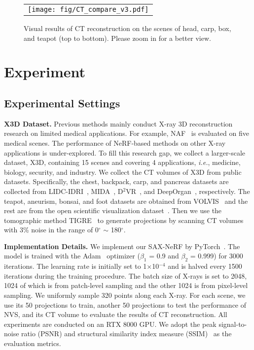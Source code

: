 \documentclass[10pt,twocolumn,letterpaper]{article}
\begin{document}
\begin{figure*}[t]
	\begin{center}
		\begin{tabular}[t]{c} \hspace{-2.8mm}
			\texttt{[image: fig/CT\_compare\_v3.pdf]}
		\end{tabular}
	\end{center}
	\vspace{-5mm}
	\caption{\small Visual results of CT reconstruction on the scenes of head, carp, box, and teapot (top to bottom). Please zoom in for a better view.}
	\label{fig:ct_vis_compare}
	\vspace{-1mm}
\end{figure*}

\section{Experiment}
\label{sec:exp}


\subsection{Experimental Settings}
\vspace{0mm}

\noindent\textbf{X3D Dataset.} Previous methods mainly conduct X-ray 3D reconstruction research on limited medical applications. For example, NAF~\cite{naf} is evaluated on five medical scenes. The performance of NeRF-based methods on other X-ray applications is under-explored. To fill this research gap, we collect a larger-scale dataset, X3D, containing 15 scenes and covering 4 applications, \emph{i.e.}, medicine, biology, security, and industry. We collect the CT volumes of X3D from public datasets. Specifically, the chest, backpack, carp, and pancreas datasets are collected from LIDC-IDRI~\cite{LIDC-IDRI}, MIDA~\cite{backpack}, D$^2$VR~\cite{carp}, and DeepOrgan~\cite{pancreas}, respectively. The teapot, aneurism, bonsai, and foot datasets are obtained from VOLVIS~\cite{volvis} and the rest are from the open scientific visualization dataset~\cite{osvd}. Then we use the tomographic method TIGRE~\cite{tigre} to generate projections by scanning CT volumes with 3\% noise in the range of 0$^{\circ}$ $\sim$ 180$^{\circ}$.

\vspace{1mm}
\noindent\textbf{Implementation Details.} We implement our SAX-NeRF by PyTorch~\cite{pytorch}. The model is trained with the Adam~\cite{adam} optimizer ($\beta_1$ = 0.9 and $\beta_2$ = 0.999) for 3000 iterations. The learning rate is initially set to 1$\times$10$^{-4}$ and is halved every 1500 iterations during the training procedure. The batch size of X-rays is set to 2048, 1024 of which is from patch-level sampling and the other 1024 is from pixel-level sampling. We uniformly sample 320 points along each X-ray. For each scene, we use its 50 projections to train, another 50 projections to test the performance of NVS, and its CT volume to evaluate the results of CT reconstruction. All experiments are conducted on an RTX 8000 GPU. We adopt the peak signal-to-noise ratio (PSNR) and structural similarity index measure (SSIM)~\cite{ssim} as the evaluation metrics.
\end{document}
